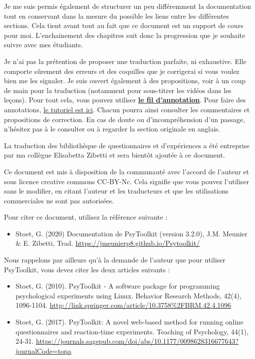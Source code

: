 \documentclass[
]{book}
\providecommand{\tightlist}{%
  \setlength{\itemsep}{0pt}\setlength{\parskip}{0pt}}
\begin{document}
Je me suis permis également de structurer un peu différemment la
documentation tout en conservant dans la mesure du possible les liens
entre les différentes sections. Cela tient avant tout au fait que ce
document est un support de cours pour moi. L'enchainement des chapitres
suit donc la progression que je souhaite suivre avec mes étudiants.

Je n'ai pas la prétention de proposer une traduction parfaite, ni
exhaustive. Elle comporte sûrement des erreurs et des coquilles que je
corrigerai si vous voulez bien me les signaler. Je suis ouvert également
à des propositions, voir à un coup de main pour la traduction (notamment
pour sous-titrer les vidéos dans les leçons). Pour tout cela, vous
pouvez utiliser
\href{https://hyp.is/go?url=https\%3A\%2F\%2Fjmeunierp8.github.io\%2FPsytoolkit\%2F\&group=__world__}{\textbf{le
fil d'annotation}}. Pour faire des annotations,
\href{https://jmeunierp8.github.io/Guide-utilisateur-Hypothesis/s3.html}{le
tutoriel est ici}. Chacun pourra ainsi consulter les commentaires et
propositions de correction. En cas de doute ou d'incompréhension d'un
passage, n'hésitez pas à le consulter ou à regarder la section originale
en anglais.

La traduction des bibliothèque de questionnaires et d'expériences a été
entreprise par ma collègue Elisabetta Zibetti et sera bientôt ajoutée à
ce document.

Ce document est mis à disposition de la communauté avec l'accord de
l'auteur et sous licence creative commons CC-BY-Nc. Cela signifie que
vous pouvez l'utiliser sans le modifier, en citant l'auteur et les
traducteurs et que les utilisations commerciales ne sont pas autorisées.

Pour citer ce document, utilisez la référence suivante :

\begin{itemize}
\tightlist
\item
  Stoet, G. (2020) Documentation de PsyToolkit (version 3.2.0), J.M.
  Meunier \& E. Zibetti, Trad.
  \url{https://jmeunierp8.github.io/Psytoolkit/}
\end{itemize}

Nous rappelons par ailleurs qu'à la demande de l'auteur que pour
utiliser PsyToolkit, vous devez citer les deux articles suivants :

\begin{itemize}
\item
  Stoet, G. (2010). PsyToolkit - A software package for programming
  psychological experiments using Linux. Behavior Research Methods,
  42(4), 1096-1104.
  \url{http://link.springer.com/article/10.3758\%2FBRM.42.4.1096}
\item
  Stoet, G. (2017). PsyToolkit: A novel web-based method for running
  online questionnaires and reaction-time experiments. Teaching of
  Psychology, 44(1), 24-31.
  \url{https://journals.sagepub.com/doi/abs/10.1177/0098628316677643?journalCode=topa}
\end{itemize}
\end{document}
